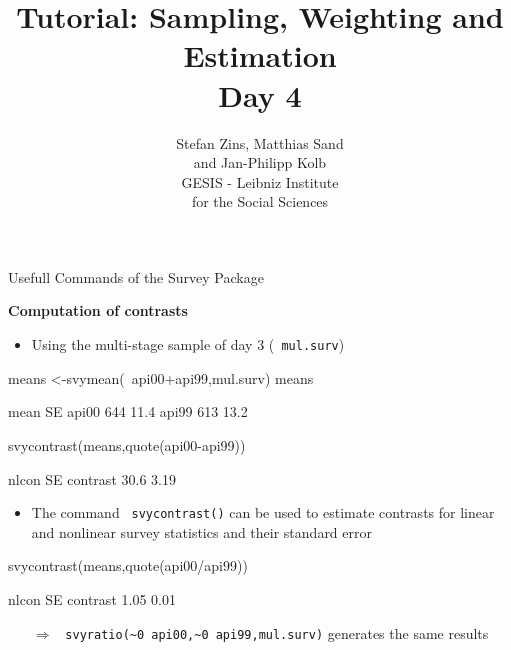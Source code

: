 \documentclass[11pt,german,hideothersubsections]{beamer}
\title[Day 1]{Tutorial: Sampling, Weighting and Estimation\\ \Large{Day 4} }
\author[M. Sand]{Stefan Zins, Matthias Sand\\ and Jan-Philipp Kolb\\ \vspace{.5cm} \footnotesize{GESIS - Leibniz Institute\\ for the Social Sciences}}
\newcommand{\R}[1]{{\tt \color{blue}  #1}}
\begin{document}

\maketitle
\begin{frame}[fragile]{Usefull Commands} {of the Survey Package}
\footnotesize{
\vspace{-.25cm}
\begin{center}
\textbf{Computation of contrasts}
\end{center}
\begin{itemize}
\item Using the multi-stage sample of day 3 (\R{mul.surv})
\end{itemize}
\begin{Schunk}
\begin{Sinput}
 means <-svymean(~api00+api99,mul.surv)
 means
\end{Sinput}
\begin{Soutput}
      mean   SE
api00  644 11.4
api99  613 13.2
\end{Soutput}
\begin{Sinput}
 svycontrast(means,quote(api00-api99))
\end{Sinput}
\begin{Soutput}
         nlcon   SE
contrast  30.6 3.19
\end{Soutput}
\end{Schunk}
\begin{itemize}
\item The command \R{svycontrast()} can be used to estimate contrasts for linear and nonlinear survey statistics and their standard error
\end{itemize}
\begin{Schunk}
\begin{Sinput}
 svycontrast(means,quote(api00/api99))
\end{Sinput}
\begin{Soutput}
         nlcon   SE
contrast  1.05 0.01
\end{Soutput}
\end{Schunk}
\begin{itemize}
\item[$\Rightarrow$] \R{svyratio(\textasciitilde0 api00,\textasciitilde0 api99,mul.surv)} generates the same results
\end{itemize}
}
\end{frame}
\end{document}
